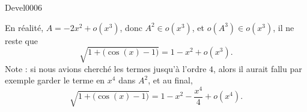 \begin{corrige}{Devel0006}
\begin{enumerate}
En réalité, $A=-2x^2+o(x^3)$, donc $A^2\in o(x^3)$, et $o(A^3)\in o(x^3)$, il ne reste que
\begin{equation}
	\sqrt{1+\big( \cos(x)-1 \big)}=1-x^2+o(x^3).
\end{equation}
Note : si nous avions cherché les termes jusqu'à l'ordre $4$, alors il aurait fallu par exemple garder le terme en $x^4$ dans $A^2$, et au final,
\begin{equation}
		\sqrt{1+\big( \cos(x)-1 \big)}=1-x^2-\frac{ x^4 }{ 4 }+o(x^4).
\end{equation}

\end{enumerate}


\end{corrige}
